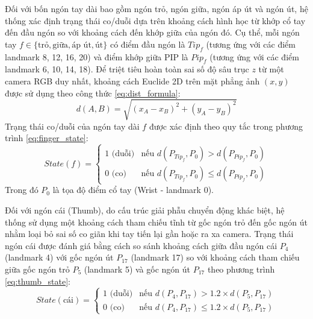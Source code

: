 \documentclass[../BTL.tex]{subfiles}
\begin{document}
Đối với bốn ngón tay dài bao gồm ngón trỏ, ngón giữa, ngón áp út và ngón út, hệ thống xác định trạng thái co/duỗi dựa trên khoảng cách hình học từ khớp cổ tay đến đầu ngón so với khoảng cách đến khớp giữa của ngón đó. Cụ thể, mỗi ngón tay $f \in \{\text{trỏ}, \text{giữa}, \text{áp út}, \text{út}\}$ có điểm đầu ngón là $Tip_f$ (tương ứng với các điểm landmark 8, 12, 16, 20) và điểm khớp giữa PIP là $Pip_f$ (tương ứng với các điểm landmark 6, 10, 14, 18). Để triệt tiêu hoàn toàn sai số độ sâu trục $z$ từ một camera RGB duy nhất, khoảng cách Euclide 2D trên mặt phẳng ảnh $(x, y)$ được sử dụng theo công thức \eqref{eq:dist_formula}:
\begin{equation}
\label{eq:dist_formula}
d(A, B) = \sqrt{(x_A - x_B)^2 + (y_A - y_B)^2}
\end{equation}
Trạng thái co/duỗi của ngón tay dài $f$ được xác định theo quy tắc trong phương trình \eqref{eq:finger_state}:
\begin{equation}
\label{eq:finger_state}
State(f) = 
\begin{cases} 
1 \text{ (duỗi)} & \text{nếu } d(P_{Tip_f}, P_0) > d(P_{Pip_f}, P_0) \\ 
0 \text{ (co)} & \text{nếu } d(P_{Tip_f}, P_0) \le d(P_{Pip_f}, P_0)
\end{cases}
\end{equation}
Trong đó $P_0$ là tọa độ điểm cổ tay (Wrist - landmark 0).

Đối với ngón cái (Thumb), do cấu trúc giải phẫu chuyển động khác biệt, hệ thống sử dụng một khoảng cách tham chiếu tĩnh từ gốc ngón trỏ đến gốc ngón út nhằm loại bỏ sai số co giãn khi tay tiến lại gần hoặc ra xa camera. Trạng thái ngón cái được đánh giá bằng cách so sánh khoảng cách giữa đầu ngón cái $P_4$ (landmark 4) với gốc ngón út $P_{17}$ (landmark 17) so với khoảng cách tham chiếu giữa gốc ngón trỏ $P_5$ (landmark 5) và gốc ngón út $P_{17}$ theo phương trình \eqref{eq:thumb_state}:
\begin{equation}
\label{eq:thumb_state}
State(\text{cái}) = 
\begin{cases} 
1 \text{ (duỗi)} & \text{nếu } d(P_4, P_{17}) > 1.2 \times d(P_5, P_{17}) \\ 
0 \text{ (co)} & \text{nếu } d(P_4, P_{17}) \le 1.2 \times d(P_5, P_{17})
\end{cases}
\end{equation}
\end{document}
